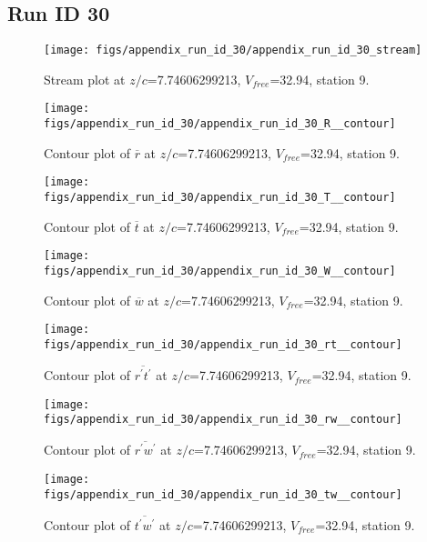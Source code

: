 \subsection{Run ID 30}
\begin{figure}[H]
\centering
\texttt{[image: figs/appendix\_run\_id\_30/appendix\_run\_id\_30\_stream]}
\caption{Stream plot at $z/c$=7.74606299213, $V_{free}$=32.94, station 9.}
\label{fig:appendix_run_id_30_stream}
\end{figure}


\begin{figure}[H]
\centering
\texttt{[image: figs/appendix\_run\_id\_30/appendix\_run\_id\_30\_R\_\_contour]}
\caption{Contour plot of $\overline{r}$ at $z/c$=7.74606299213, $V_{free}$=32.94, station 9.}
\label{fig:appendix_run_id_30_R__contour}
\end{figure}


\begin{figure}[H]
\centering
\texttt{[image: figs/appendix\_run\_id\_30/appendix\_run\_id\_30\_T\_\_contour]}
\caption{Contour plot of $\overline{t}$ at $z/c$=7.74606299213, $V_{free}$=32.94, station 9.}
\label{fig:appendix_run_id_30_T__contour}
\end{figure}


\begin{figure}[H]
\centering
\texttt{[image: figs/appendix\_run\_id\_30/appendix\_run\_id\_30\_W\_\_contour]}
\caption{Contour plot of $\overline{w}$ at $z/c$=7.74606299213, $V_{free}$=32.94, station 9.}
\label{fig:appendix_run_id_30_W__contour}
\end{figure}


\begin{figure}[H]
\centering
\texttt{[image: figs/appendix\_run\_id\_30/appendix\_run\_id\_30\_rt\_\_contour]}
\caption{Contour plot of $\overline{r^\prime t^\prime}$ at $z/c$=7.74606299213, $V_{free}$=32.94, station 9.}
\label{fig:appendix_run_id_30_rt__contour}
\end{figure}


\begin{figure}[H]
\centering
\texttt{[image: figs/appendix\_run\_id\_30/appendix\_run\_id\_30\_rw\_\_contour]}
\caption{Contour plot of $\overline{r^\prime w^\prime}$ at $z/c$=7.74606299213, $V_{free}$=32.94, station 9.}
\label{fig:appendix_run_id_30_rw__contour}
\end{figure}


\begin{figure}[H]
\centering
\texttt{[image: figs/appendix\_run\_id\_30/appendix\_run\_id\_30\_tw\_\_contour]}
\caption{Contour plot of $\overline{t^\prime w^\prime}$ at $z/c$=7.74606299213, $V_{free}$=32.94, station 9.}
\label{fig:appendix_run_id_30_tw__contour}
\end{figure}


